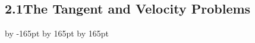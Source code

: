 \documentclass{sebase}
\begin{document}
\chapter[2\quad Limits and Derivatives]{}

\section{2.1\quad The Tangent and Velocity Problems}



\renewcommand{\RM}{1}%
\setcounter{page}{2}%
\setlength{\columnsep}{24pt}
\advance \leftskip by -165pt
\advance\hsize by 165pt
\advance\linewidth by 165pt
\end{document}
